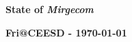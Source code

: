 \def\CC{{C\nolinebreak[4]\hspace{-.05em}\raisebox{.4ex}{\tiny\bf ++}}}

\begin{frame}\frametitle{}
\vspace*{0.2in}
\centerline{\textrm{{\huge\bfseries\color{myOrange} State of \textit{Mirgecom}}}}
\smallskip
\centerline{\textrm{{\large\bfseries{Fri@CEESD - \today}}}}
\vspace*{0.2in}
\begin{center}
\vspace*{0.4in}
\end{center}
\end{frame}

